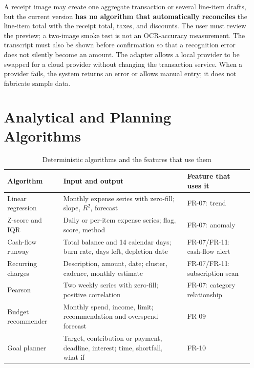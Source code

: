 A receipt image may create one aggregate transaction or several
line-item drafts, but the current version \textbf{has no algorithm that
automatically reconciles} the line-item total with the receipt total,
taxes, and discounts. The user must review the preview; a two-image
smoke test is not an OCR-accuracy measurement. The transcript must also
be shown before confirmation so that a recognition error does not
silently become an amount. The adapter allows a local provider to be
swapped for a cloud provider without changing the transaction service.
When a provider fails, the system returns an error or allows manual
entry; it does not fabricate sample data.

\section{Analytical and Planning Algorithms}

\begin{table}[htbp]
  \centering
  \caption{Deterministic algorithms and the features that use them}
  \label{tab:algorithms}
  \small
  \begin{tabularx}{\textwidth}{|p{3.0cm}|X|X|}
    \hline
    \textbf{Algorithm} & \textbf{Input and output} &
    \textbf{Feature that uses it} \\ \hline
    Linear regression & Monthly expense series with zero-fill; slope,
    $R^2$, forecast & FR-07: trend \\ \hline
    Z-score and IQR & Daily or per-item expense series; flag, score,
    method & FR-07: anomaly \\ \hline
    Cash-flow runway & Total balance and 14 calendar days; burn rate,
    days left, depletion date & FR-07/FR-11: cash-flow alert \\ \hline
    Recurring charges & Description, amount, date; cluster, cadence,
    monthly estimate & FR-07/FR-11: subscription scan \\ \hline
    Pearson & Two weekly series with zero-fill; positive correlation &
    FR-07: category relationship \\ \hline
    Budget recommender & Monthly spend, income, limit; recommendation
    and overspend forecast & FR-09 \\ \hline
    Goal planner & Target, contribution or payment, deadline, interest;
    time, shortfall, what-if & FR-10 \\ \hline
  \end{tabularx}
\end{table}

